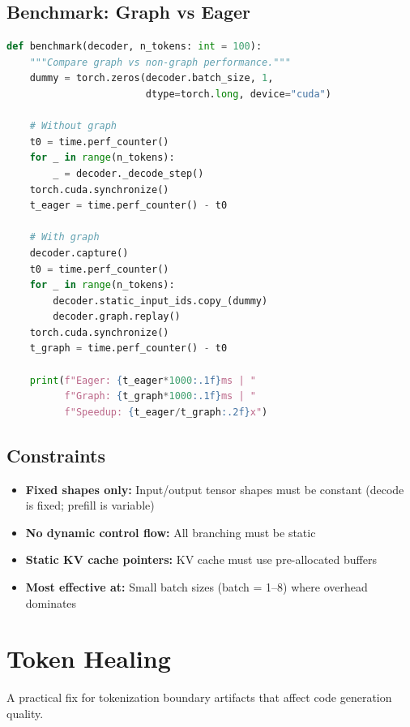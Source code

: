 \documentclass[11pt,a4paper]{article}
\begin{document}
\subsection{Benchmark: Graph vs Eager}

\begin{lstlisting}[language=Python, caption={CUDA Graph Benchmark}]
def benchmark(decoder, n_tokens: int = 100):
    """Compare graph vs non-graph performance."""
    dummy = torch.zeros(decoder.batch_size, 1, 
                        dtype=torch.long, device="cuda")
    
    # Without graph
    t0 = time.perf_counter()
    for _ in range(n_tokens):
        _ = decoder._decode_step()
    torch.cuda.synchronize()
    t_eager = time.perf_counter() - t0
    
    # With graph
    decoder.capture()
    t0 = time.perf_counter()
    for _ in range(n_tokens):
        decoder.static_input_ids.copy_(dummy)
        decoder.graph.replay()
    torch.cuda.synchronize()
    t_graph = time.perf_counter() - t0
    
    print(f"Eager: {t_eager*1000:.1f}ms | "
          f"Graph: {t_graph*1000:.1f}ms | "
          f"Speedup: {t_eager/t_graph:.2f}x")
\end{lstlisting}

\subsection{Constraints}

\begin{itemize}[itemsep=1pt]
  \item \textbf{Fixed shapes only:} Input/output tensor shapes must be constant (decode is fixed; prefill is variable)
  \item \textbf{No dynamic control flow:} All branching must be static
  \item \textbf{Static KV cache pointers:} KV cache must use pre-allocated buffers
  \item \textbf{Most effective at:} Small batch sizes (batch = 1--8) where overhead dominates
\end{itemize}

\section{Token Healing}

A practical fix for tokenization boundary artifacts that affect code generation quality.
\end{document}
